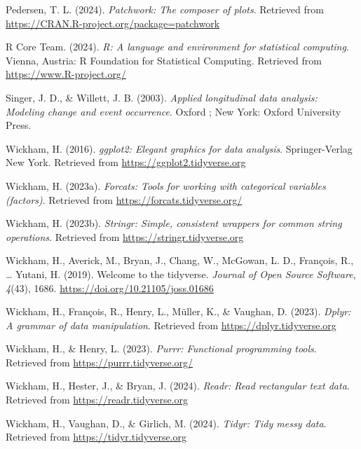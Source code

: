\documentclass[
  man,floatsintext]{apa6}
\newlength{\cslhangindent}
\newenvironment{CSLReferences}[2] %
 {\begin{list}{}{%
  \setlength{\itemindent}{0pt}
  \setlength{\leftmargin}{0pt}
  \setlength{\parsep}{0pt}
  \ifodd #1
   \setlength{\leftmargin}{\cslhangindent}
   \setlength{\itemindent}{-1\cslhangindent}
  \fi
  \setlength{\itemsep}{#2\baselineskip}}}
 {\end{list}}
\begin{document}
\begin{CSLReferences}{1}{0}
Pedersen, T. L. (2024). \emph{Patchwork: The composer of plots}. Retrieved from \url{https://CRAN.R-project.org/package=patchwork}

R Core Team. (2024). \emph{R: A language and environment for statistical computing}. Vienna, Austria: R Foundation for Statistical Computing. Retrieved from \url{https://www.R-project.org/}

Singer, J. D., \& Willett, J. B. (2003). \emph{Applied longitudinal data analysis: Modeling change and event occurrence}. Oxford ; New York: Oxford University Press.

Wickham, H. (2016). \emph{ggplot2: Elegant graphics for data analysis}. Springer-Verlag New York. Retrieved from \url{https://ggplot2.tidyverse.org}

Wickham, H. (2023a). \emph{Forcats: Tools for working with categorical variables (factors)}. Retrieved from \url{https://forcats.tidyverse.org/}

Wickham, H. (2023b). \emph{Stringr: Simple, consistent wrappers for common string operations}. Retrieved from \url{https://stringr.tidyverse.org}

Wickham, H., Averick, M., Bryan, J., Chang, W., McGowan, L. D., François, R., \ldots{} Yutani, H. (2019). Welcome to the {tidyverse}. \emph{Journal of Open Source Software}, \emph{4}(43), 1686. \url{https://doi.org/10.21105/joss.01686}

Wickham, H., François, R., Henry, L., Müller, K., \& Vaughan, D. (2023). \emph{Dplyr: A grammar of data manipulation}. Retrieved from \url{https://dplyr.tidyverse.org}

Wickham, H., \& Henry, L. (2023). \emph{Purrr: Functional programming tools}. Retrieved from \url{https://purrr.tidyverse.org/}

Wickham, H., Hester, J., \& Bryan, J. (2024). \emph{Readr: Read rectangular text data}. Retrieved from \url{https://readr.tidyverse.org}

Wickham, H., Vaughan, D., \& Girlich, M. (2024). \emph{Tidyr: Tidy messy data}. Retrieved from \url{https://tidyr.tidyverse.org}

\end{CSLReferences}
\end{document}
